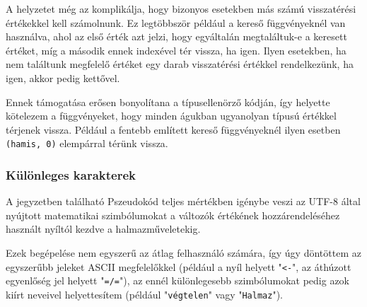 A helyzetet még az komplikálja, hogy bizonyos esetekben más számú visszatérési értékekkel kell számolnunk. Ez legtöbbször például a kereső függvényeknél van használva, ahol az első érték azt jelzi, hogy egyáltalán megtaláltuk-e a keresett értéket, míg a második ennek indexével tér vissza, ha igen. Ilyen esetekben, ha nem találtunk megfelelő értéket egy darab visszatérési értékkel rendelkezünk, ha igen, akkor pedig kettővel.

Ennek támogatása erősen bonyolítana a típusellenörző kódján, így helyette kötelezem a függvényeket, hogy minden águkban ugyanolyan típusú értékkel térjenek vissza. Például a fentebb említett kereső függvényeknél ilyen esetben \texttt{(hamis, 0)} elempárral térünk vissza.

\subsubsection{Különleges karakterek}

A jegyzetben található Pszeudokód teljes mértékben igénybe veszi az UTF-8 által nyújtott matematikai szimbólumokat a változók értékének hozzárendeléséhez használt nyíltól kezdve a halmazműveletekig.

Ezek begépelése nem egyszerű az átlag felhasználó számára, így úgy döntöttem az egyszerűbb jeleket ASCII megfelelőkkel (például a nyíl helyett "\texttt{<-}", az áthúzott egyenlőség jel helyett "\texttt{=/=}"), az ennél különlegesebb szimbólumokat pedig azok kiírt neveivel helyettesítem (például "\texttt{végtelen}" vagy "\texttt{Halmaz}").